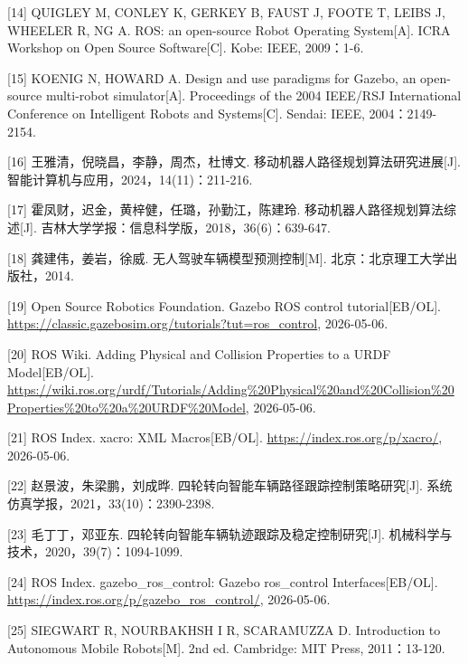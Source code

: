 {[}14{]} QUIGLEY M, CONLEY K, GERKEY B, FAUST J, FOOTE T, LEIBS J,
WHEELER R, NG A. ROS: an open-source Robot Operating System{[}A{]}. ICRA
Workshop on Open Source Software{[}C{]}. Kobe: IEEE, 2009：1-6.

{[}15{]} KOENIG N, HOWARD A. Design and use paradigms for Gazebo, an
open-source multi-robot simulator{[}A{]}. Proceedings of the 2004
IEEE/RSJ International Conference on Intelligent Robots and
Systems{[}C{]}. Sendai: IEEE, 2004：2149-2154.

{[}16{]} 王雅清，倪晓昌，李静，周杰，杜博文.
移动机器人路径规划算法研究进展{[}J{]}.
智能计算机与应用，2024，14(11)：211-216.

{[}17{]} 霍凤财，迟金，黄梓健，任璐，孙勤江，陈建玲.
移动机器人路径规划算法综述{[}J{]}.
吉林大学学报：信息科学版，2018，36(6)：639-647.

{[}18{]} 龚建伟，姜岩，徐威. 无人驾驶车辆模型预测控制{[}M{]}.
北京：北京理工大学出版社，2014.

{[}19{]} Open Source Robotics Foundation. Gazebo ROS control
tutorial{[}EB/OL{]}.
\href{https://classic.gazebosim.org/tutorials?tut=ros_control&utm_source=chatgpt.com}{https://classic.gazebosim.org/tutorials?tut=ros\_control},
2026-05-06.

{[}20{]} ROS Wiki. Adding Physical and Collision Properties to a URDF
Model{[}EB/OL{]}.
\href{https://wiki.ros.org/urdf/Tutorials/Adding\%20Physical\%20and\%20Collision\%20Properties\%20to\%20a\%20URDF\%20Model?utm_source=chatgpt.com}{https://wiki.ros.org/urdf/Tutorials/Adding\%20Physical\%20and\%20Collision\%20Properties\%20to\%20a\%20URDF\%20Model},
2026-05-06.

{[}21{]} ROS Index. xacro: XML Macros{[}EB/OL{]}.
\href{https://index.ros.org/p/xacro/?utm_source=chatgpt.com}{https://index.ros.org/p/xacro/},
2026-05-06.

{[}22{]} 赵景波，朱梁鹏，刘成晔.
四轮转向智能车辆路径跟踪控制策略研究{[}J{]}.
系统仿真学报，2021，33(10)：2390-2398.

{[}23{]} 毛丁丁，邓亚东. 四轮转向智能车辆轨迹跟踪及稳定控制研究{[}J{]}.
机械科学与技术，2020，39(7)：1094-1099.

{[}24{]} ROS Index. gazebo\_ros\_control: Gazebo ros\_control
Interfaces{[}EB/OL{]}.
\href{https://index.ros.org/p/gazebo_ros_control/?utm_source=chatgpt.com}{https://index.ros.org/p/gazebo\_ros\_control/},
2026-05-06.

{[}25{]} SIEGWART R, NOURBAKHSH I R, SCARAMUZZA D. Introduction to
Autonomous Mobile Robots{[}M{]}. 2nd ed. Cambridge: MIT Press,
2011：13-120.

